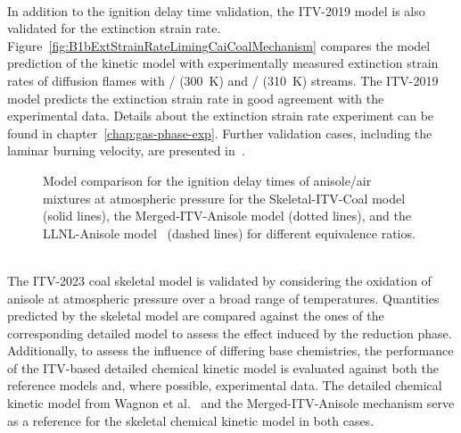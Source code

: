 \begin{refsection}
\\
In addition to the ignition delay time validation, the ITV-2019 model is also validated for the extinction strain rate. Figure~\ref{fig:B1bExtStrainRateLimingCaiCoalMechanism} compares the model prediction of the kinetic model with experimentally measured extinction strain rates of diffusion flames with / (\SI{300}{K}) and / (\SI{310}{K}) streams. The ITV-2019 model predicts the extinction strain rate in good agreement with the experimental data. Details about the extinction strain rate experiment can be found in chapter~\ref{chap:gas-phase-exp}. Further validation cases, including the laminar burning velocity, are presented in~\cite{Cai2020}.
\begin{figure}[b]
  \centering
  \hfill
  \hfill
  \caption{Model comparison for the ignition delay times of anisole/air mixtures at atmospheric pressure for the Skeletal-ITV-Coal model (solid lines), the Merged-ITV-Anisole model (dotted lines), and the LLNL-Anisole model~\cite{Wagnon2018} (dashed lines) for different equivalence ratios.}
  \label{fig:B1bIDTAnisoleCoalMechanism}
\end{figure}
\\
The ITV-2023 coal skeletal model is validated by considering the oxidation of anisole at atmospheric pressure over a broad range of temperatures. Quantities predicted by the skeletal model are compared against the ones of the corresponding detailed model to assess the effect induced by the reduction phase. Additionally, to assess the influence of differing base chemistries, the performance of the ITV-based detailed chemical kinetic model is evaluated against both the reference models and, where possible, experimental data. The detailed chemical kinetic model from Wagnon et al.~\cite{Wagnon2018} and the Merged-ITV-Anisole mechanism serve as a reference for the skeletal chemical kinetic model in both cases.
\begin{figure}[t]
  \centering
  \hfill

\end{figure}
\end{refsection}
